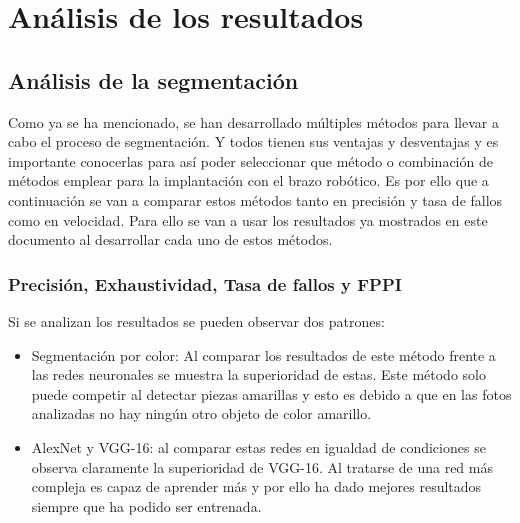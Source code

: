 \chapter{Análisis de los resultados}
\label{chap:Resultados}
\section{Análisis de la segmentación}
Como ya se ha mencionado, se han desarrollado múltiples métodos para llevar a cabo el proceso de segmentación. Y todos tienen sus ventajas y desventajas y es importante conocerlas para así poder seleccionar que método o combinación de métodos emplear para la implantación con el brazo robótico. Es por ello que a continuación se van a comparar estos métodos tanto en precisión y tasa de fallos como en velocidad. Para ello se van a usar los resultados ya mostrados en este documento al desarrollar cada uno de estos métodos.

\subsection{Precisión, Exhaustividad, Tasa de fallos y FPPI}
Si se analizan los resultados se pueden observar dos patrones:
\begin{itemize}
\item Segmentación por color: Al comparar los resultados de este método frente a las redes neuronales se muestra la superioridad de estas. Este método solo puede competir al detectar piezas amarillas y esto es debido a que en las fotos analizadas no hay ningún otro objeto de color amarillo.
\item AlexNet y VGG-16: al comparar estas redes en igualdad de condiciones se observa claramente la superioridad de VGG-16. Al tratarse de una red más compleja es capaz de aprender más y por ello ha dado mejores resultados siempre que ha podido ser entrenada.
\end{itemize}

